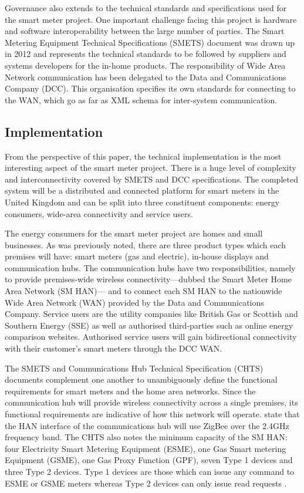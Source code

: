       Governance also extends to the technical standards and specifications used for the smart meter project. One important challenge facing this project is hardware and software interoperability between the large number of parties. The Smart Metering Equipment Technical Specifications (SMETS) document was drawn up in 2012 and represents the technical standards to be followed by suppliers and systems developers for the in-home products. The responsibility of Wide Area Network communication has been delegated to the Data and Communications Company (DCC). This organisation specifies its own standards for connecting to the WAN, which go as far as XML schema for inter-system communication.

    \subsection{Implementation}
      From the perspective of this paper, the technical implementation is the most interesting aspect of the smart meter project. There is a huge level of complexity and interconnectivity covered by SMETS and DCC specifications. The completed system will be a distributed and connected platform for smart meters in the United Kingdom and can be split into three constituent components: energy consumers, wide-area connectivity and service users.

      The energy consumers for the smart meter project are homes and small businesses. As was previously noted, there are three product types which each premises will have: smart meters (gas and electric), in-house displays and communication hubs. The communication hubs have two responsibilities, namely to provide premises-wide wireless connectivity---dubbed the Smart Meter Home Area Network (SM HAN)--- and to connect each SM HAN to the nationwide Wide Area Network (WAN) provided by the Data and Communications Company. Service users are the utility companies like British Gas or Scottish and Southern Energy (SSE) as well as authorised third-parties such as online energy comparison websites. Authorised service users will gain bidirectional connectivity with their customer's smart meters through the DCC WAN.

      The SMETS and Communications Hub Technical Specification (CHTS) documents complement one another to unambiguously define the functional requirements for smart meters and the home area networks. Since the communication hub will provide wireless connectivity across a single premises, its functional requirements are indicative of how this network will operate. \citet{chts:2014} state that the HAN interface of the communications hub will use ZigBee over the 2.4GHz frequency band. The CHTS also notes the minimum capacity of the SM HAN: four Electricity Smart Metering Equipment (ESME), one Gas Smart metering Equipment (GSME), one Gas Proxy Function (GPF), seven Type 1 devices and three Type 2 devices. Type 1 devices are those which can issue any command to ESME or GSME meters whereas Type 2 devices can only issue read requests \citep{EnergyUtilities:2014}.

